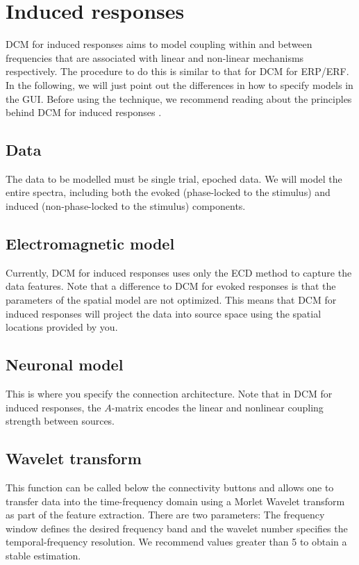 \section{Induced responses}
DCM for induced responses aims to model coupling within and between frequencies that are associated with linear and non-linear mechanisms respectively. The procedure to do this is similar to that for DCM for ERP/ERF. In the following, we will just point out the differences in how to specify models in the GUI. Before using the technique, we recommend reading about the principles behind DCM for induced responses \cite{cc_induced}.

\subsection{Data}
The data to be modelled must be single trial, epoched data. We will model the entire spectra, including both the evoked (phase-locked to the stimulus) and induced (non-phase-locked to the stimulus) components.

\subsection{Electromagnetic model}
Currently, DCM for induced responses uses only the ECD method to capture the data features. Note that a difference to DCM for evoked responses is that the parameters of the spatial model are not optimized. This means that DCM for induced responses will project the data into source space using the spatial locations provided by you.


\subsection{Neuronal model}
This is where you specify the connection architecture. Note that in DCM for induced responses, the $A$-matrix encodes the linear and nonlinear coupling strength between sources.


\subsection{Wavelet transform}
This function can be called below the connectivity buttons and allows one to transfer data into the time-frequency domain using a Morlet Wavelet transform as part of the feature extraction.  There are two parameters: The frequency window defines the desired frequency band and the wavelet number specifies the temporal-frequency resolution. We recommend values greater than 5 to obtain a stable estimation.

